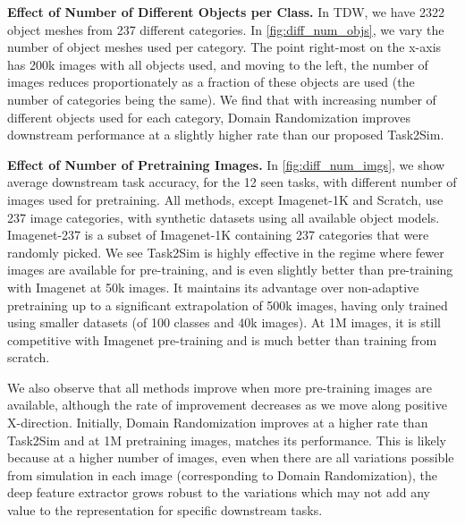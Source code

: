 \vspace{1mm}
\noindent \textbf{Effect of Number of Different Objects per Class.} In TDW, we have 2322 object meshes from 237 different categories. In \cref{fig:diff_num_objs}, we vary the number of object meshes used per category. The point right-most on the x-axis has 200k images with all objects used, and moving to the left, the number of images reduces proportionately as a fraction of these objects are used (the number of categories being the same). We find that with increasing number of different objects used for each category, Domain Randomization improves downstream performance at a slightly higher rate than our proposed Task2Sim. 


\vspace{1mm}
\noindent \textbf{Effect of Number of Pretraining Images.} In \cref{fig:diff_num_imgs}, we show average downstream task accuracy, for the 12 seen tasks, with different number of images used for pretraining. All methods, except Imagenet-1K and Scratch, use 237 image categories, with synthetic datasets using all available object models. Imagenet-237 is a subset of Imagenet-1K containing 237 categories that were randomly picked.
We see Task2Sim is highly effective in the regime where fewer images are available for pre-training, and is even slightly better than pre-training with Imagenet at 50k images. It maintains its advantage over non-adaptive pretraining up to a significant extrapolation of 500k images, having only trained using smaller datasets (of 100 classes and 40k images). At 1M images, it is still competitive with Imagenet pre-training and is much better than training from scratch. 

We also observe that all methods improve when more pre-training images are available, although the rate of improvement decreases as we move along positive X-direction.
Initially, Domain Randomization improves at a higher rate than Task2Sim and at 1M pretraining images, matches its performance. This is likely because at a higher number of images, even when there are all variations possible from simulation in each image (corresponding to Domain Randomization), the deep feature extractor grows robust to the variations which may not add any value to the representation for specific downstream tasks. 

